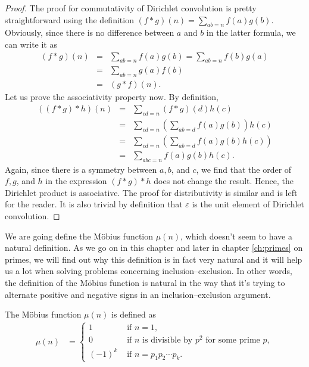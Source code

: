 \documentclass[12pt]{subfile}
\begin{document}
		\begin{proof}
			The proof for commutativity of Dirichlet convolution is pretty straightforward using the definition $(f\ast g)(n)=\displaystyle\sum_{ab=n}f(a)g(b)$. Obviously, since there is no difference between $a$ and $b$ in the latter formula, we can write it as
				\begin{eqnarray*}
					(f\ast g)(n) &=& \sum_{ab=n}f(a)g(b)= \sum_{ab=n}f(b)g(a)\\
								 &=& \sum_{ab=n}g(a)f(b)\\
								 &=& (g\ast f)(n).
				\end{eqnarray*}
			Let us prove the associativity property now. By definition,
				\begin{eqnarray*}
					((f \ast g) \ast h)(n) &=& \sum_{cd=n} (f\ast g)(d) h(c)\\
										   &=& \sum_{cd=n} \left(\sum_{ab=d} f(a)g(b)\right) h(c)\\
										   &=& \sum_{cd=n} \left(\sum_{ab=d} f(a)g(b) h(c)\right)\\
										   &=& \sum_{abc=n} f(a)g(b) h(c).
				\end{eqnarray*}
			Again, since there is a symmetry between $a,b$, and $c$, we find that the order of $f,g$, and $h$ in the expression $(f \ast g) \ast h$ does not change the result. Hence, the Dirichlet product is associative.
			The proof for distributivity is similar and is left for the reader. It is also trivial by definition that $\varepsilon$ is the unit element of Dirichlet convolution.
		\end{proof}


		We are going define the M\"{o}bius function $\mu(n)$, which doesn't seem to have a natural definition. As we go on in this chapter and later in chapter \ref{ch:primes} on primes, we will find out why this definition is in fact very natural and it will help us a lot when solving problems concerning inclusion--exclusion. In other words, the definition of the M\"{o}bius function is natural in the way that it's trying to alternate positive and negative signs in an inclusion--exclusion argument.

		\begin{definition}\label{def:mobius}
			The M\"{o}bius function $\mu(n)$ is defined as
				\begin{align*}
					\mu(n) & =
						\begin{cases}
						1&\mbox{ if }n=1,\\
						0&\mbox{ if }n
						\mbox{ is divisible by }p^2
						\mbox{ for some prime }p,\\
						(-1)^k&\mbox{ if }n=p_1p_2\cdots p_k.
						\end{cases}
				\end{align*}
		\end{definition}
\end{document}
